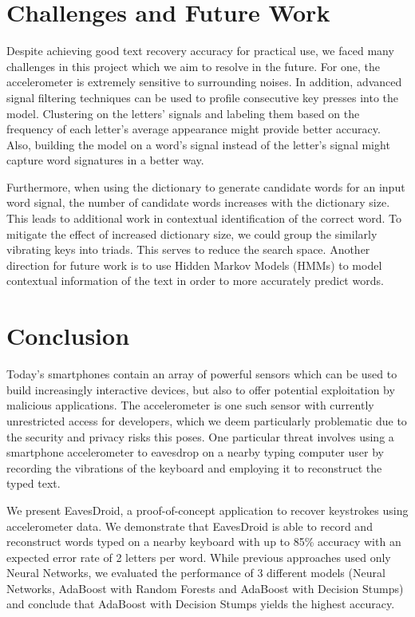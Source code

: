 \documentclass[11pt,conference]{IEEEtran}
\begin{document}
\section{Challenges and Future Work}
Despite achieving good text recovery accuracy for practical use, we faced many challenges in
this project which we aim to resolve in the future.
For one, the accelerometer is extremely sensitive to surrounding noises. In addition, advanced signal filtering techniques can be used to
profile consecutive key presses into the model. Clustering on the letters' signals and labeling them based on the frequency of
each letter's average appearance might provide better accuracy. Also, building the model on a word's signal
instead of the letter's signal might capture word signatures in a better way.

Furthermore, when using the dictionary to generate
candidate words for an input word signal, the number of candidate words increases with the dictionary
size. This leads to additional work in contextual identification of the correct word. To mitigate the
effect of increased dictionary size, we could group the similarly vibrating keys into triads. This serves
to reduce the search space. 
Another direction for future work is to use Hidden Markov Models (HMMs) to model contextual information of the text in order to more accurately predict words.


\section{Conclusion}
\label{sec:conclusion}
Today's smartphones contain an array of powerful sensors which can be used to build increasingly interactive devices, but also to offer potential exploitation by malicious applications. The accelerometer is one such sensor with currently unrestricted access for developers, which we deem particularly problematic due to the security and privacy risks this poses. One particular threat involves using a smartphone accelerometer to eavesdrop on a nearby typing computer user by recording the vibrations of the keyboard and employing it to reconstruct the typed text.

We present EavesDroid, a proof-of-concept application to recover keystrokes using accelerometer data. We demonstrate that EavesDroid is able to record and reconstruct words typed on a nearby keyboard with up to 85\% accuracy with an expected error rate of 2 letters per word. While previous approaches used only Neural Networks, we evaluated the performance of 3 different models (Neural Networks, AdaBoost with Random Forests and AdaBoost with Decision Stumps) and conclude that AdaBoost with Decision Stumps yields the highest accuracy.
\end{document}
